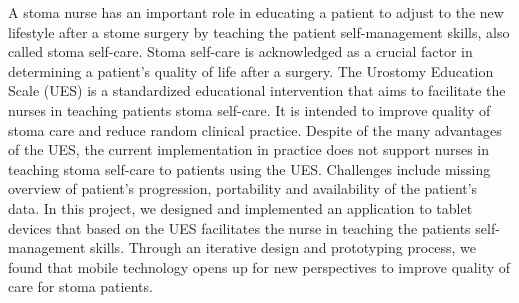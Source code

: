 A stoma nurse has an important role in educating a patient to adjust to the new lifestyle after a stome surgery by teaching the patient self-management skills, also called stoma self-care. Stoma self-care is acknowledged as a crucial factor in determining a patient's quality of life after a surgery. The Urostomy Education Scale (UES) is a standardized educational intervention that aims to facilitate the nurses in teaching patients stoma self-care. It is intended to improve quality of stoma care and reduce random clinical practice. Despite of the many advantages of the UES, the current implementation in practice does not support nurses in teaching stoma self-care to patients using the UES. Challenges include missing overview of patient's progression, portability and availability of the patient's data. In this project, we designed and implemented an application to tablet devices that based on the UES facilitates the nurse in teaching the patients self-management skills. Through an iterative design and prototyping process, we found that mobile technology opens up for new perspectives to improve quality of care for stoma patients.  